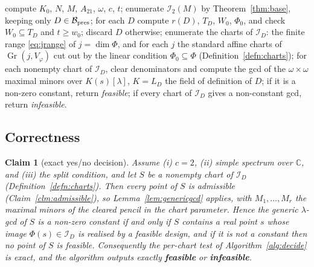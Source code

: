 \documentclass[journal]{IEEEtran}
\theoremstyle{plainn}
\newtheorem{claim}[thm]{Claim}
\theoremstyle{remark}
\newcommand{\Gr}{\operatorname{Gr}}
\begin{document}
\begin{algorithm}[H]
\caption{Decision at $c=2$, split, simple spectrum over $\mathbb C$.}
\label{alg:decide}
\begin{algorithmic}[1]
\State compute $K_0$, $N$, $M$, $A_{21}$, $\omega$, $c$, $t$;
\State enumerate $\mathcal I_2(M)$ by Theorem~\ref{thm:base}, keeping only
$D\in\mathcal B_{\rm pres}$;
\State for each $D$ compute $r(D)$, $T_D$, $W_0$, $\Phi_0$, and check $W_0\subseteq T_D$ and
$t\ge w_0$; discard $D$ otherwise;
\State enumerate the charts of $\mathcal I_D$: the finite range \eqref{eq:jrange} of $j=\dim\Phi$, and for
each $j$ the standard affine charts of $\Gr(j,V_\varphi)$ cut out by the linear condition
$\Phi_0\subseteq\Phi$ (Definition~\ref{defn:charts});
\State for each nonempty chart of $\mathcal I_D$, clear denominators and compute the gcd of the
$\omega\times\omega$ maximal minors over $K(s)[\lambda]$, $K=L_D$ the field of definition of $D$; if it is a non-zero
constant, return \emph{feasible};
\State if every chart of $\mathcal I_D$ gives a non-constant gcd, return \emph{infeasible}.

\end{algorithmic}
\end{algorithm}

\subsection{Correctness}\label{sec:correct}

\begin{claim}[exact yes/no decision]\label{clm:twovalued}
Assume (i) $c=2$, (ii) simple spectrum over $\mathbb C$, and (iii) the split condition, and let $S$ be a
nonempty chart of
$\mathcal I_D$ (Definition~\ref{defn:charts}). Then every point of $S$ is admissible
(Claim~\ref{clm:admissible}), so Lemma~\ref{lem:genericgcd} applies, with $M_1,\dots,M_r$ the maximal
minors of the cleared pencil in the chart parameter. Hence the generic $\lambda$-gcd of $S$ is a non-zero
constant if and only if $S$ contains a real point $s$ whose image $\Phi(s)\in\mathcal I_D$ is realised by a
feasible design, and if it is not a constant then no point of $S$ is feasible. Consequently the per-chart
test of Algorithm~\ref{alg:decide} is exact, and the algorithm outputs exactly \textbf{feasible} or
\textbf{infeasible}.
\end{claim}
\end{document}
